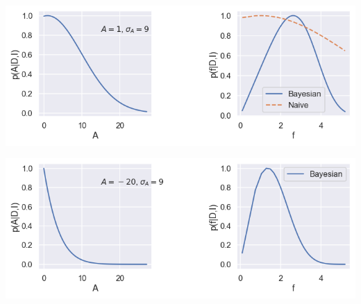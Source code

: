 \documentclass[%
oneside,                 %
final,                   %
10pt]{article}
\begin{document}


\vspace{6mm}

\centerline{\includegraphics[width=0.7\linewidth]{fig/error_square_root_1_9.png}}

\vspace{6mm}





\vspace{6mm}

\centerline{\includegraphics[width=0.7\linewidth]{fig/error_square_root_-20_9.png}}

\vspace{6mm}




\end{document}
